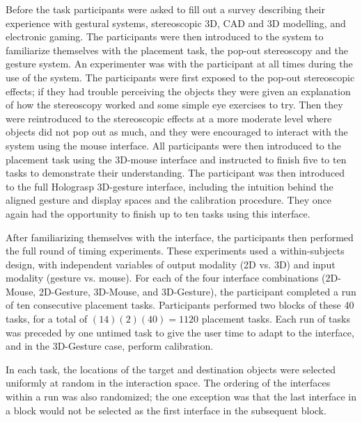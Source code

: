 \documentclass[pageno]{jpaper}
\begin{document}
Before the task participants were asked to fill out a survey describing their experience with
gestural systems, stereoscopic 3D, CAD and 3D modelling, and electronic gaming.
The participants were then introduced to the system to familiarize themselves with the placement task, the pop-out
stereoscopy and the gesture system. An experimenter was with the participant at all times during
the use of the system. The participants were first exposed to the pop-out stereoscopic effects;
if they had trouble perceiving the objects they were given an explanation of how the stereoscopy
worked and some simple eye exercises to try. Then they were reintroduced to the stereoscopic effects
at a more moderate level where objects did not pop out as much, and they were encouraged
to interact with the system using the mouse interface. All participants were then introduced to the placement
task using the 3D-mouse interface and instructed to finish five to ten tasks to demonstrate their understanding.
The participant was then introduced to the full Holograsp 3D-gesture interface, including the intuition behind the aligned gesture and display
spaces and the calibration procedure. They once again had the opportunity to finish up to ten tasks using this interface.

After familiarizing themselves with the interface, the participants then performed the full round of timing experiments. These
experiments used a within-subjects design, with independent variables of output modality (2D vs. 3D) and input modality (gesture vs. mouse).
For each of the four interface combinations (2D-Mouse, 2D-Gesture, 3D-Mouse, and 3D-Gesture), the participant completed a
run of ten consecutive placement tasks. Participants performed two blocks of these 40 tasks, for a total of $(14)(2)(40) = 1120$
placement tasks. Each run of tasks was preceded by one untimed task to give the user time to adapt to the interface, and
in the 3D-Gesture case, perform calibration.

In each task, the locations of the target and destination objects were selected uniformly at random in the interaction space. The
ordering of the interfaces within a run was also randomized; the one exception was that the last interface in a block
would not be selected as the first interface in the subsequent block.
\end{document}
